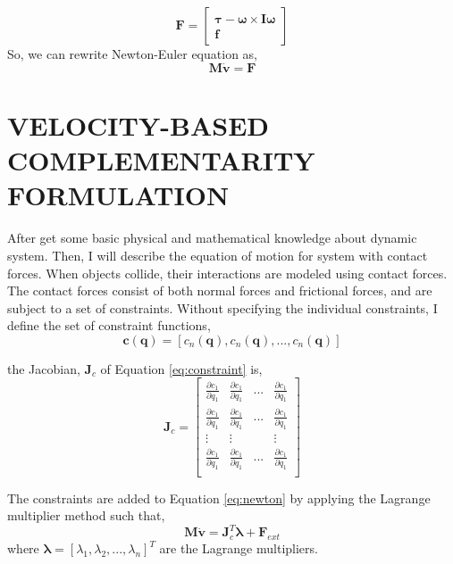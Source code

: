     \begin{equation}
        \mathbf{F} = \left[ \begin{array}{c} \pmb{\tau} - \pmb{\omega} \times \pmb{I} \pmb{\omega}\\ \pmb{f} \end{array}\right]
        \label{F}
    \end{equation}
    So, we can rewrite Newton-Euler equation as,
    \begin{equation}
        \pmb{M}\dot{\mathbf{v}} = \mathbf{F}
        \label{eq:newton}
    \end{equation}


\section{VELOCITY-BASED COMPLEMENTARITY FORMULATION}
    After get some basic physical and mathematical knowledge about dynamic system. Then, I will describe the equation of motion for system with contact forces. 
    When objects collide, their interactions are modeled using contact forces. The contact forces consist of both normal forces and frictional forces, and are subject to a set of constraints. Without specifying the individual constraints, I define the set of constraint functions,
    \begin{equation}
        \pmb{c}(\pmb{q}) = [c_n(\pmb{q}),c_n(\pmb{q}),...,c_n(\pmb{q})]
        \label{eq:constraint}
    \end{equation}

    the Jacobian, $\pmb{J}_{c}$ of Equation \ref{eq:constraint} is,
    \begin{equation}
        \pmb{J}_{c} = 
        \begin{bmatrix}
            \frac{\partial{c_1}}{\partial{q_1}} & \frac{\partial{c_1}}{\partial{q_1}} & ... & \frac{\partial{c_1}}{\partial{q_1}} \\
            \frac{\partial{c_1}}{\partial{q_1}} & \frac{\partial{c_1}}{\partial{q_1}} & ... & \frac{\partial{c_1}}{\partial{q_1}} \\
            \vdots & \vdots & & \vdots\\
            \frac{\partial{c_1}}{\partial{q_1}} & \frac{\partial{c_1}}{\partial{q_1}} & ... & \frac{\partial{c_1}}{\partial{q_1}} \\
        \end{bmatrix}
        \label{Jacobianb}
    \end{equation}

    The constraints are added to Equation \ref{eq:newton} by applying the Lagrange multiplier method such that,
    \begin{equation}
        \pmb{M}\dot{\mathbf{v}} = \pmb{J}_{c}^{T}\pmb{\lambda} + \mathbf{F}_{ext}
        \label{eq:cone}
    \end{equation}
    where $\pmb{\lambda} = [\lambda_1, \lambda_2, ... , \lambda_n]^T$ are the Lagrange multipliers.

